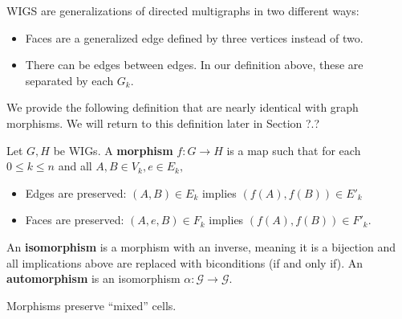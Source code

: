 WIGS are generalizations of directed multigraphs in two different ways:
\begin{itemize}
  \item Faces are a generalized edge defined by three vertices instead of two.
  \item There can be edges between edges. In our definition above, these are separated by each $G_{k}.$
\end{itemize}

We provide the following definition that are nearly identical with graph morphisms. We will return to this definition later in Section ?.?
\begin{definition} Let $G, H$ be WIGs. A \textbf{morphism} $f: G \to H$ is a map such that for each $0 \leq k \leq n$ and all $A, B \in V_{k}, e \in E_{k},$
  \begin{itemize}
    \item Edges are preserved: $(A, B) \in E_{k}$ implies $(f(A), f(B)) \in E'_{k}$
    \item Faces are preserved: $(A, e, B) \in F_{k}$ implies $(f(A), f(B)) \in F'_{k}.$
  \end{itemize}
  An \textbf{isomorphism} is a morphism with an inverse, meaning it is a bijection and all implications above are replaced with biconditions (if and only if). An \textbf{automorphism} is an isomorphism $\alpha: \mathcal{G} \to \mathcal{G}.$
\end{definition}
\begin{lemma}
Morphisms preserve ``mixed'' cells.
\end{lemma}

